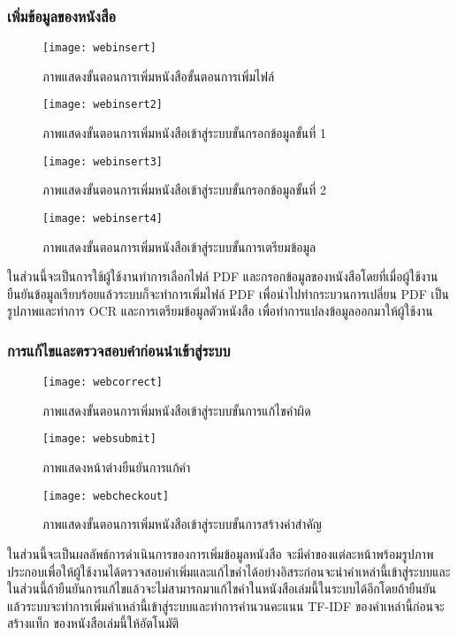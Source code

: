 \subsubsection{เพิ่มข้อมูลของหนังสือ}
\begin{figure}[H]
    \centering
    \texttt{[image: webinsert]}
    \caption{ภาพแสดงขั้นตอนการเพิ่มหนังสือขั้นตอนการเพิ่มไฟล์}\label{fig:webinsert}
\end{figure}
\begin{figure}[H]
    \centering
    \texttt{[image: webinsert2]}
    \caption{ภาพแสดงขั้นตอนการเพิ่มหนังสือเข้าสู่ระบบขั้นกรอกข้อมูลขั้นที่ 1}\label{fig:webinsert2}
\end{figure}
\begin{figure}[H]
    \centering
    \texttt{[image: webinsert3]}
    \caption{ภาพแสดงขั้นตอนการเพิ่มหนังสือเข้าสู่ระบบขั้นกรอกข้อมูลขั้นที่ 2}\label{fig:webinsert3}
\end{figure}

\begin{figure}[H]
    \centering
    \texttt{[image: webinsert4]}
    \caption{ภาพแสดงขั้นตอนการเพิ่มหนังสือเข้าสู่ระบบขั้นการเตรียมข้อมูล}\label{fig:webdel}
\end{figure}
ในส่วนนี้จะเป็นการใช้ผู้ใช้งานทำการเลือกไฟล์ PDF และกรอกข้อมูลของหนังสือโดยที่เมื่อผู้ใช้งานยืนยันข้อมูลเรียบร้อยแล้วระบบก็จะทำการเพิ่มไฟล์ PDF เพื่อนำไปทำกระบวนการเปลี่ยน PDF เป็นรูปภาพและทำการ OCR และการเตรียมข้อมูลตัวหนังสือ  เพื่อทำการแปลงข้อมูลออกมาให้ผู้ใช้งาน

\subsubsection{การแก้ไขและตรวจสอบคำก่อนนำเข้าสู่ระบบ}
\begin{figure}[H]
    \centering
    \texttt{[image: webcorrect]}
    \caption{ภาพแสดงขั้นตอนการเพิ่มหนังสือเข้าสู่ระบบขั้นการแก้ไขคำผิด}\label{fig:webcorrect}
\end{figure}

\begin{figure}[H]
    \centering
    \texttt{[image: websubmit]}
    \caption{ภาพแสดงหน้าต่างยืนยันการแก้คำ}\label{fig:websubmit}
\end{figure}

\begin{figure}[H]
    \centering
    \texttt{[image: webcheckout]}
    \caption{ภาพแสดงขั้นตอนการเพิ่มหนังสือเข้าสู่ระบบขั้นการสร้างคำสำคัญ}\label{fig:webcheckout}
\end{figure}
ในส่วนนี้จะเป็นผลลัพธ์การดำเนินการของการเพิ่มข้อมูลหนังสือ จะมีคำของแต่ละหน้าพร้อมรูปภาพประกอบเพื่อให้ผู้ใช้งานได้ตรวจสอบคำเพิ่มและแก้ไขคำได้อย่างอิสระก่อนจะนำคำเหล่านี้เข้าสู่ระบบและในส่วนนี้ถ้ายืนยันการแก้ไขแล้วจะไม่สามารถมาแก้ไขคำในหนังสือเล่มนี้ในระบบได้อีกโดยถ้ายืนยันแล้วระบบจะทำการเพิ่มคำเหล่านี้เข้าสู่ระบบและทำการคำนวนคะแนน TF-IDF ของคำเหล่านี้ก่อนจะสร้างแท็ก ของหนังสือเล่มนี้ให้อัตโนมัติ

